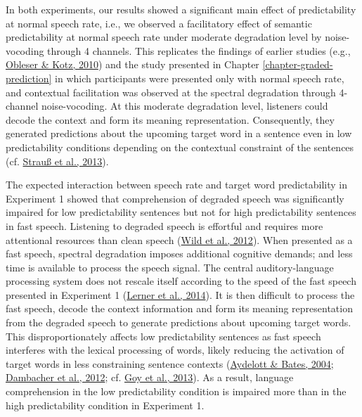 \documentclass[a4paper, nobind]{templates/ociamthesis}
\begin{document}
In both experiments, our results showed a significant main effect of predictability at normal speech rate,
i.e., we observed a facilitatory effect of semantic predictability at normal speech rate under moderate degradation level by noise-vocoding through 4 channels.
This replicates the findings of earlier studies (e.g., \protect\hyperlink{ref-Obleser2010}{Obleser \& Kotz, 2010}) and the study presented in Chapter \ref{chapter-graded-prediction} in which participants were presented only with normal speech rate, and contextual facilitation was observed at the spectral degradation through 4-channel noise-vocoding.
At this moderate degradation level, listeners could decode the context and form its meaning representation.
Consequently, they generated predictions about the upcoming target word in a sentence even in low predictability conditions depending on the contextual constraint of the sentences (cf. \protect\hyperlink{ref-Strauss2013}{Strauß et al., 2013}).

The expected interaction between speech rate and target word predictability in Experiment 1 showed that comprehension of degraded speech was significantly impaired for low predictability sentences but not for high predictability sentences in fast speech.
Listening to degraded speech is effortful and requires more attentional resources than clean speech (\protect\hyperlink{ref-Wild2012}{Wild et al., 2012}).
When presented as a fast speech, spectral degradation imposes additional cognitive demands; and less time is available to process the speech signal.
The central auditory-language processing system does not rescale itself according to the speed of the fast speech presented in Experiment 1 (\protect\hyperlink{ref-Lerner2014}{Lerner et al., 2014}).
It is then difficult to process the fast speech, decode the context information and form its meaning representation from the degraded speech to generate predictions about upcoming target words.
This disproportionately affects low predictability sentences as fast speech interferes with the lexical processing of words, likely reducing the activation of target words in less constraining sentence contexts (\protect\hyperlink{ref-Aydelott2004}{Aydelott \& Bates, 2004}; \protect\hyperlink{ref-Dambacher2012}{Dambacher et al., 2012}; cf. \protect\hyperlink{ref-Goy2013}{Goy et al., 2013}).
As a result, language comprehension in the low predictability condition is impaired more than in the high predictability condition in Experiment 1.
\end{document}

